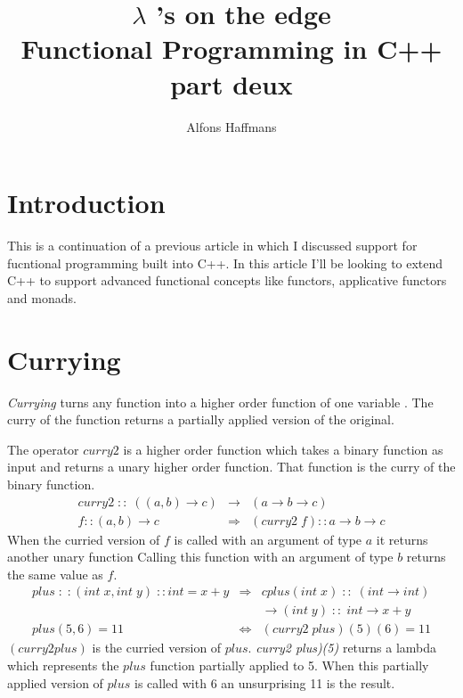 \documentclass[12pt,fleqn]{article}
\begin{document}
\title{$\lambda$ 's on the edge \\ Functional Programming in C++ part deux}
\author {Alfons Haffmans}
\maketitle
\section* {Introduction}
This is a continuation of a previous article in which I discussed support for fucntional programming built into C++.
In this article I'll be looking to extend C++ to support advanced functional concepts like functors, applicative functors and monads.


\section*{Currying}
{\em Currying} turns any function into a higher order function of one variable \cite{field}.
The curry of the function returns a partially applied version of the original.

The operator $curry2$ is a higher order function which takes a binary function as input 
and returns a unary higher order function.
That function is the curry of the binary function.
\begin{eqnarray*}
curry2 \; :: \; ((a,b) \rightarrow c) &\rightarrow& (a \rightarrow b \rightarrow c) \\
f::(a,b) \rightarrow c &\Rightarrow&  (curry2\;f)::a \rightarrow b \rightarrow c 
\end{eqnarray*}
When the curried version of $f$ is called with an argument of type $a$ it returns another unary function 
Calling this function with an argument of type $b$ returns the same value as $f$.
\begin{eqnarray*}
plus\;:\;:(int \;x, int \;y) \;::int = x+y &\Rightarrow& cplus(int\; x) \;::\; (int \rightarrow int)  \\
                                                             & & \rightarrow (int \; y) \;::\; int \rightarrow x+y  \\
plus(5,6) = 11 &\Leftrightarrow&(curry2 \; plus)(5)(6) = 11
\end{eqnarray*}
$(curry2 plus)$ is the curried version of $plus$.
{\em curry2 plus)(5)} returns a lambda which represents the $plus$ function partially applied to 5. 
When this partially applied version of $plus$ is called with 6 an unsurprising 11 is the result.
\end{document}
